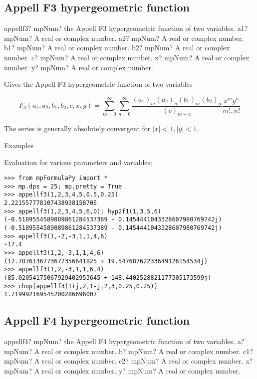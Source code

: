 \subsection{Appell F3 hypergeometric function}

\begin{mpFunctionsExtract}
	\mpFunctionSeven
	{appellf3? mpNum? the Appell F3 hypergeometric function of two variables.}
	{a1? mpNum? A real or complex number.}
	{a2? mpNum? A real or complex number.}
	{b1? mpNum? A real or complex number.}	
	{b2? mpNum? A real or complex number.}
	{c? mpNum? A real or complex number.}		
	{x? mpNum? A real or complex number.}		
	{y? mpNum? A real or complex number.}		
\end{mpFunctionsExtract}

\vpara
Gives the Appell F3 hypergeometric function of two variables

\begin{equation}
F_3(a_1,a_2,b_1,b_2,c,x,y) = \sum_{m=0}^{\infty} \sum_{n=0}^{\infty} \frac{(a_1)_{m}(a_2)_{n}(b_1)_m (b_2)_n}{(c)_{m+n}} \frac{x^my^n}{m!,n!}
\end{equation}


The series is generally absolutely convergent for $|x|<1, |y|<1$.

Examples

Evaluation for various parameters and variables:

\begin{lstlisting}
>>> from mpFormulaPy import *
>>> mp.dps = 25; mp.pretty = True
>>> appellf3(1,2,3,4,5,0.5,0.25)
2.221557778107438938158705
>>> appellf3(1,2,3,4,5,6,0); hyp2f1(1,3,5,6)
(-0.5189554589089861284537389 - 0.1454441043328607980769742j)
(-0.5189554589089861284537389 - 0.1454441043328607980769742j)
>>> appellf3(1,-2,-3,1,1,4,6)
-17.4
>>> appellf3(1,2,-3,1,1,4,6)
(17.7876136773677356641825 + 19.54768762233649126154534j)
>>> appellf3(1,2,-3,1,1,6,4)
(85.02054175067929402953645 + 148.4402528821177305173599j)
>>> chop(appellf3(1+j,2,1-j,2,3,0.25,0.25))
1.719992169545200286696007
\end{lstlisting}




\subsection{Appell F4 hypergeometric function}

\begin{mpFunctionsExtract}
	\mpFunctionSix
	{appellf4? mpNum? the Appell F4 hypergeometric function of two variables.}
	{a? mpNum? A real or complex number.}
	{b? mpNum? A real or complex number.}	
	{c1? mpNum? A real or complex number.}
	{c2? mpNum? A real or complex number.}	
	{x? mpNum? A real or complex number.}		
	{y? mpNum? A real or complex number.}		
\end{mpFunctionsExtract}

